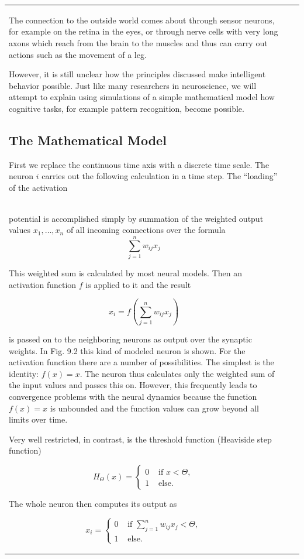 \documentclass[10pt]{book}
\begin{document}
\begin{center}
\begin{tabular}{|l|l|l|}
The connection to the outside world comes about through sensor neurons, for example on the retina in the eyes, or through nerve cells with very long axons which reach from the brain to the muscles and thus can carry out actions such as the movement of a leg.

However, it is still unclear how the principles discussed make intelligent behavior possible. Just like many researchers in neuroscience, we will attempt to explain using simulations of a simple mathematical model how cognitive tasks, for example pattern recognition, become possible.

\subsection{The Mathematical Model}
First we replace the continuous time axis with a discrete time scale. The neuron $i$ carries out the following calculation in a time step. The ``loading'' of the activation\\
potential is accomplished simply by summation of the weighted output values $x_{1}, \ldots, x_{n}$ of all incoming connections over the formula
$$
\sum_{j=1}^{n} w_{i j} x_{j}
$$

This weighted sum is calculated by most neural models. Then an activation function $f$ is applied to it and the result

$$
x_{i}=f\left(\sum_{j=1}^{n} w_{i j} x_{j}\right)
$$

is passed on to the neighboring neurons as output over the synaptic weights. In Fig. 9.2 this kind of modeled neuron is shown. For the activation function there are a number of possibilities. The simplest is the identity: $f(x)=x$. The neuron thus calculates only the weighted sum of the input values and passes this on. However, this frequently leads to convergence problems with the neural dynamics because the function $f(x)=x$ is unbounded and the function values can grow beyond all limits over time.

Very well restricted, in contrast, is the threshold function (Heaviside step function)

$$
H_{\Theta}(x)= \begin{cases}0 & \text { if } x<\Theta, \\ 1 & \text { else. }\end{cases}
$$

The whole neuron then computes its output as

$$
x_{i}= \begin{cases}0 & \text { if } \sum_{j=1}^{n} w_{i j} x_{j}<\Theta, \\ 1 & \text { else. }\end{cases}
$$


\end{tabular}
\end{center}
\end{document}

